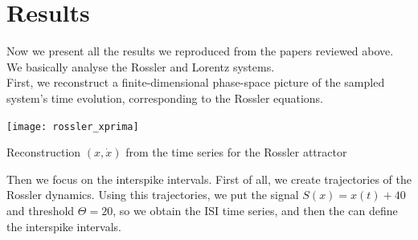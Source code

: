 \documentclass[10pt]{article}
\begin{document}
\section{Results}
Now we present all the results we reproduced from the papers reviewed above. We basically analyse the Rossler and Lorentz systems.\\
First, we reconstruct a finite-dimensional phase-space picture of the sampled system's time evolution, corresponding to the Rossler equations.

\begin{center}
\texttt{[image: rossler\_xprima]}
\caption{Reconstruction $(x,\dot x)$ from the time series for the Rossler attractor}
\label{fig:rossler_xprima}
\end{center}

Then we focus on the interspike intervals. First of all, we create trajectories of the Rossler dynamics. Using this trajectories, we put the signal $S(x)=x(t)+40$ and threshold $\Theta=20$, so we obtain the ISI time series, and then the can define the interspike intervals.
\end{document}
